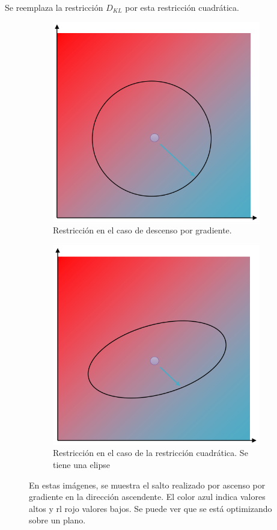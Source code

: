 Se reemplaza la restricción $D_{KL}$ por esta restricción cuadrática. 
\begin{figure}[H]
	\centering
    \begin{subfigure}{.45\textwidth}
        \centering
        \includegraphics[width=0.8\linewidth]{figures/gradiente.png}
        \caption{Restricción en el caso de descenso por gradiente.}
    \end{subfigure}
    \begin{subfigure}{.45\textwidth}
        \centering
        \includegraphics[width=0.8\linewidth]{figures/cuadratica.png}
        \caption{Restricción en el caso de la restricción cuadrática. Se tiene una elipse}
    \end{subfigure}
    \caption{En estas imágenes, se muestra el salto realizado por ascenso por gradiente en la
    dirección ascendente. El color azul indica valores altos y rl rojo valores bajos. Se
puede ver que se está optimizando sobre un plano.}
\end{figure}

